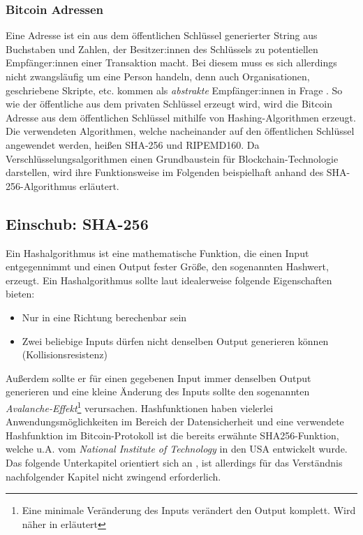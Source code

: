 \subsubsection{Bitcoin Adressen}
Eine Adresse ist ein aus dem öffentlichen Schlüssel generierter String aus Buchstaben und Zahlen, der Besitzer:innen des Schlüssels zu potentiellen Empfänger:innen einer Transaktion macht. Bei diesem muss es sich allerdings nicht zwangsläufig um eine Person handeln, denn auch Organisationen, geschriebene Skripte, etc. kommen als \emph{abstrakte} Empfänger:innen in Frage \cite[S. 65]{antanopoulos_2014}.
So wie der öffentliche aus dem privaten Schlüssel erzeugt wird, wird die Bitcoin Adresse aus dem öffentlichen Schlüssel mithilfe von Hashing-Algorithmen erzeugt. 
Die verwendeten Algorithmen, welche nacheinander auf den öffentlichen Schlüssel angewendet werden, heißen SHA-256 und RIPEMD160.
Da Verschlüsselungsalgorithmen einen Grundbaustein für Blockchain-Technologie darstellen, wird ihre Funktionsweise im Folgenden beispielhaft anhand des SHA-256-Algorithmus erläutert. 

\subsection{Einschub: SHA-256}
Ein Hashalgorithmus ist eine mathematische Funktion, die einen Input entgegennimmt und einen Output fester Größe, den sogenannten Hashwert, erzeugt. Ein Hashalgorithmus sollte laut \cite{paar_pelzl_2010} idealerweise folgende Eigenschaften bieten:
\begin{itemize}
	\item Nur in eine Richtung berechenbar sein
	\item Zwei beliebige Inputs dürfen nicht denselben Output generieren können (Kollisionsresistenz)
\end{itemize}
Außerdem sollte er für einen gegebenen Input immer denselben Output generieren und eine kleine Änderung des Inputs sollte den sogenannten \emph{Avalanche-Effekt}\footnote{Eine minimale Veränderung des Inputs verändert den Output komplett. Wird näher in \cite[S. 66]{paar_pelzl_2010} erläutert} verursachen.
Hashfunktionen haben vielerlei Anwendungsmöglichkeiten im Bereich der Datensicherheit und eine verwendete Hashfunktion im Bitcoin-Protokoll ist die bereits erwähnte SHA256-Funktion, welche u.A. vom \emph{National Institute of Technology} in den USA entwickelt wurde. Das folgende Unterkapitel orientiert sich an \cite{dang_2015}, ist allerdings für das Verständnis nachfolgender Kapitel nicht zwingend erforderlich.
